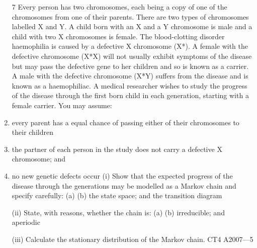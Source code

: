 \documentclass[a4paper,12pt]{article}
\begin{document}
\begin{enumerate}
7
Every person has two chromosomes, each being a copy of one of the chromosomes
from one of their parents. There are two types of chromosomes labelled X and Y. A
child born with an X and a Y chromosome is male and a child with two X
chromosomes is female.
The blood-clotting disorder haemophilia is caused by a defective X chromosome
(X*). A female with the defective chromosome (X*X) will not usually exhibit
symptoms of the disease but may pass the defective gene to her children and so is
known as a carrier. A male with the defective chromosome (X*Y) suffers from the
disease and is known as a haemophiliac.
A medical researcher wishes to study the progress of the disease through the first born
child in each generation, starting with a female carrier.
You may assume:
\item every parent has a equal chance of passing either of their chromosomes to their
children
\item the partner of each person in the study does not carry a defective X chromosome;
and
\item no new genetic defects occur
(i)
Show that the expected progress of the disease through the generations may be
modelled as a Markov chain and specify carefully:
(a)
(b)
the state space; and
the transition diagram

(ii)
State, with reasons, whether the chain is:
(a)
(b)
irreducible; and
aperiodic

(iii)
Calculate the stationary distribution of the Markov chain.
CT4 A2007—5



\end{enumerate}
\end{document}
